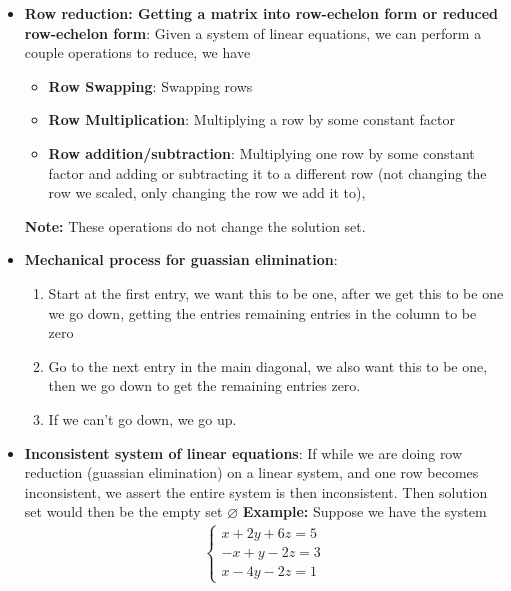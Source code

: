 \documentclass{report}
\begin{document}
\begin{itemize}
            \item \textbf{Row reduction: Getting a matrix into row-echelon form or reduced row-echelon form}: Given a system of linear equations, we can perform a couple operations to reduce, we have
                \begin{itemize}
                    \item \textbf{Row Swapping}: Swapping rows
                    \item \textbf{Row Multiplication}: Multiplying a row by some constant factor
                    \item \textbf{Row addition/subtraction}: Multiplying one row by some constant factor and adding or subtracting it to a different row (not changing the row we scaled, only changing the row we add it to),
                \end{itemize}
                \bigbreak \noindent 
                \textbf{Note:} These operations do not change the solution set.
            \item \textbf{Mechanical process for guassian elimination}:
                \begin{enumerate}
                    \item Start at the first entry, we want this to be one, after we get this to be one we go down, getting the entries remaining entries in the column to be zero
                    \item Go to the next entry in the main diagonal, we also want this to be one, then we go down to get the remaining entries zero.
                    \item If we can't go down, we go up. 
                \end{enumerate}
            \item \textbf{Inconsistent system of linear equations}: If while we are doing row reduction (guassian elimination) on a linear system, and one row becomes inconsistent, we assert the entire system is then inconsistent. Then solution set would then be the empty set $\varnothing$
                \bigbreak \noindent 
                \textbf{Example:} Suppose we have the system
                \begin{align*}
                    \begin{cases}
                        x + 2y + 6z =5 \\
                        -x + y -2z =3  \\
                        x -4y -2z = 1
                    \end{cases}

\end{align*}
\end{itemize}
\end{document}
